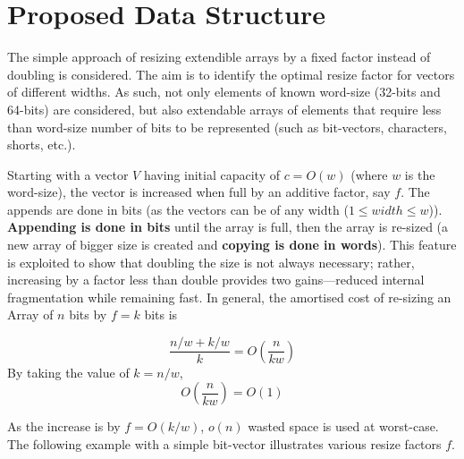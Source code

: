 \section{Proposed Data Structure}
The simple approach of resizing extendible arrays by a fixed factor instead of doubling is considered. The aim is to identify the optimal resize factor for vectors of different widths. As such, not only elements of known word-size (32-bits and 64-bits) are considered, but also extendable arrays of elements that require less than word-size number of bits to be represented (such as bit-vectors, characters, shorts, etc.).\par
Starting with a vector $V$ having initial capacity of $c=O(w)$ (where $w$ is the word-size), the vector is increased when full by an additive factor, say $f$. The appends are done in bits (as the vectors can be of any width ($1\leq width \leq w$)). \textbf{Appending is done in bits} until the array is full, then the array is re-sized (a new array of bigger size is created and \textbf{copying is done in words}). This feature is exploited to show that doubling the size is not always necessary; rather, increasing by a factor less than double provides two gains---reduced internal fragmentation while remaining fast. In general, the amortised cost of re-sizing an Array of $n$ bits by $f=k$ bits is\par
\[\frac{n/w + k/w}{k} = O(\frac{n}{kw}) \tag{1} \label{eq:1} \]
By taking the value of $k = n/w$,
\[ O(\frac{n}{kw}) = O(1) \tag{2} \label{eq:2} \]
\par
As the increase is by $f = O(k/w)$, $o(n)$ wasted space is used at worst-case. The following example with a simple bit-vector illustrates various resize factors $f$.
